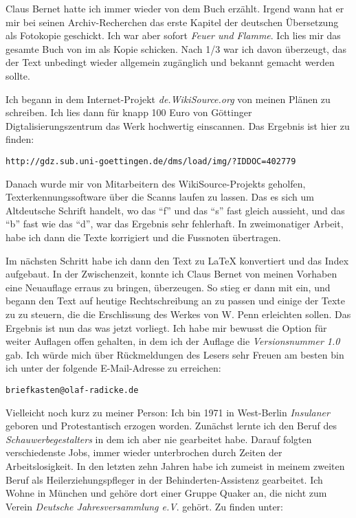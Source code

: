 \medskip

Claus Bernet hatte ich immer wieder von dem Buch erzählt. Irgend wann hat er mir
bei seinen Archiv-Recherchen das erste Kapitel der deutschen Übersetzung als
Fotokopie geschickt. Ich war aber sofort \textit{Feuer und
Flamme}. Ich lies mir das gesamte Buch von im als Kopie schicken. Nach 1/3 war
ich davon überzeugt, das der Text unbedingt wieder allgemein zugänglich und
bekannt gemacht werden sollte.

\medskip

Ich begann in dem Internet-Projekt \textit{de.WikiSource.org} von meinen Plänen
zu schreiben. Ich lies dann für knapp 100 Euro von Göttinger
Digtalisierungszentrum das Werk hochwertig einscannen. Das Ergebnis ist hier zu
finden:

\begin{center}
\texttt{http://gdz.sub.uni-goettingen.de/dms/load/img/?IDDOC=402779}
\end{center}

Danach wurde mir von Mitarbeitern des WikiSource-Projekts geholfen,
Texterkennungssoftware über die Scanns laufen zu lassen. Das es sich um
Altdeutsche Schrift handelt, wo das "`f"' und das "`s"' fast gleich aussieht,
und das "`b"' fast wie das "`d"', war das Ergebnis sehr fehlerhaft. In
zweimonatiger Arbeit, habe ich dann die Texte korrigiert und die Fussnoten
übertragen.

\medskip

Im nächsten Schritt habe ich dann den Text zu \LaTeX{} konvertiert und das Index
aufgebaut. In der Zwischenzeit, konnte ich Claus Bernet von meinen Vorhaben eine
Neuauflage erraus zu bringen, überzeugen. So stieg er dann mit ein, und begann
den Text auf heutige Rechtschreibung an zu passen und einige der Texte zu zu
steuern, die die Erschlissung des Werkes von W. Penn erleichten sollen.
Das Ergebnis ist nun das was jetzt vorliegt. Ich habe mir bewusst die
Option für weiter Auflagen offen gehalten, in dem ich der Auflage die
\textit{Versionsnummer 1.0} gab. Ich würde mich über Rückmeldungen des Lesers
sehr Freuen am besten bin ich unter der folgende E-Mail-Adresse zu erreichen:

\begin{center}
\texttt{briefkasten@olaf-radicke.de}
\end{center}

Vielleicht noch kurz zu meiner Person: Ich bin 1971 in West-Berlin
\textit{Insulaner} geboren und Protestantisch erzogen worden. Zunächst lernte
ich den Beruf des \textit{Schauwerbegestalters} in dem ich aber nie gearbeitet
habe. Darauf folgten verschiedenste Jobs, immer wieder unterbrochen durch Zeiten
der Arbeitslosigkeit. In den letzten zehn Jahren habe ich zumeist in meinem
zweiten Beruf als Heilerziehungspfleger in der Behinderten-Assistenz gearbeitet.
Ich Wohne in München und gehöre dort einer Gruppe Quaker an, die nicht zum
Verein \textit{Deutsche Jahresversammlung e.V}. gehört. Zu finden unter:

